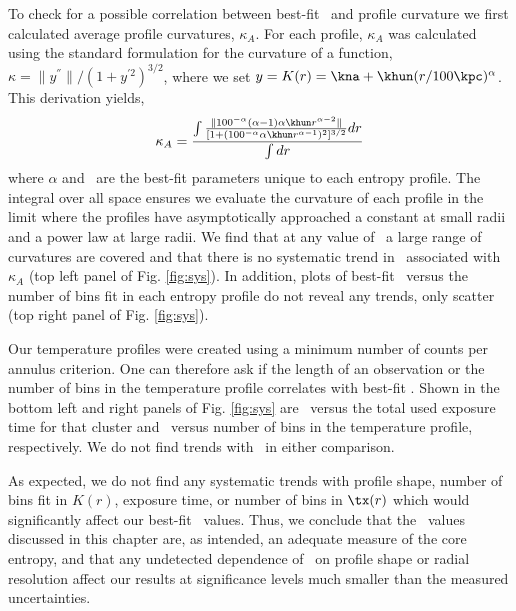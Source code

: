 To check for a possible correlation between best-fit \kna\ and profile
curvature we first calculated average profile curvatures,
$\kappa_A$. For each profile, $\kappa_A$ was calculated using the
standard formulation for the curvature of a function, $\kappa =
\|y^{''}\|/(1+y^{'2})^{3/2}$, where we set $y = K(r) =
\kna+\khun(r/100\kpc)^{\alpha}$. This derivation yields,
\begin{equation}
\kappa_A = \frac{\int\frac{\| 100^{-\alpha} (\alpha-1) \alpha \khun
  r^{\alpha-2}\|}{[1+(100^{-\alpha} \alpha \khun
    r^{\alpha-1})^2]^{3/2}} dr}{\int dr}
\label{eqn:avgcurv}
\end{equation}
where $\alpha$ and \khun\ are the best-fit parameters unique to each
entropy profile. The integral over all space ensures we evaluate the
curvature of each profile in the limit where the profiles have
asymptotically approached a constant at small radii and a power law at
large radii. We find that at any value of \kna\ a large range of
curvatures are covered and that there is no systematic trend in
\kna\ associated with $\kappa_A$ (top left panel of
Fig. \ref{fig:sys}). In addition, plots of best-fit \kna\ versus the
number of bins fit in each entropy profile do not reveal any trends,
only scatter (top right panel of Fig. \ref{fig:sys}).

Our temperature profiles were created using a minimum number of counts
per annulus criterion. One can therefore ask if the length of an
observation or the number of bins in the temperature profile
correlates with best-fit \kna. Shown in the bottom left and right
panels of Fig. \ref{fig:sys} are \kna\ versus the total used exposure
time for that cluster and \kna\ versus number of bins in the
temperature profile, respectively. We do not find trends with \kna\ in
either comparison.

As expected, we do not find any systematic trends with profile shape,
number of bins fit in $K(r)$, exposure time, or number of bins in
$\tx(r)$ which would significantly affect our best-fit
\kna\ values. Thus, we conclude that the \kna\ values discussed in
this chapter are, as intended, an adequate measure of the core entropy,
and that any undetected dependence of \kna\ on profile shape or radial
resolution affect our results at significance levels much smaller than
the measured uncertainties.

